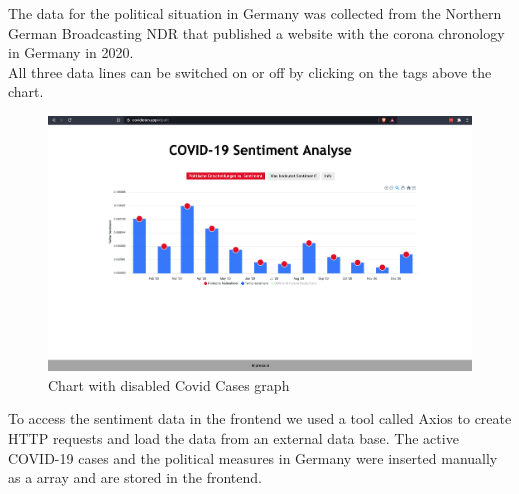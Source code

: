 \documentclass[
    fontsize=12pt,
    headings=small,
    parskip=half,           %
    bibliography=totoc,
    numbers=noenddot,       %
    open=any,               %
    ]{scrreprt}
\begin{document}
The data for the political situation in Germany was collected from the Northern German Broadcasting NDR \cite{ndr} that published a website with the corona chronology in Germany in 2020.\\
All three data lines can be switched on or off by clicking on the tags above the chart.

\begin{figure}[h]
    \centering
    \includegraphics[width=1.0\textwidth]{pic/Disabled_Covid.png}
    \caption{Chart with disabled Covid Cases graph}
    \label{fig:my_label}
\end{figure}

To access the sentiment data in the frontend we used a tool called Axios to create HTTP requests and load the data from an external data base. The active COVID-19 cases and the political measures in Germany were inserted manually as a array and are stored in the frontend. 
\end{document}
